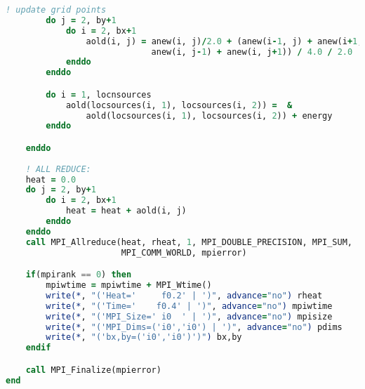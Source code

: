 \begin{lstlisting}[language=Fortran, caption={Parallel F90 implementation of the stencil test case.}]
        ! update grid points
        do j = 2, by+1 
            do i = 2, bx+1
                aold(i, j) = anew(i, j)/2.0 + (anew(i-1, j) + anew(i+1, j) +  &
                             anew(i, j-1) + anew(i, j+1)) / 4.0 / 2.0
            enddo
        enddo

        do i = 1, locnsources
            aold(locsources(i, 1), locsources(i, 2)) =  &
                aold(locsources(i, 1), locsources(i, 2)) + energy
        enddo

    enddo
   
    ! ALL REDUCE:
    heat = 0.0
    do j = 2, by+1 
        do i = 2, bx+1
            heat = heat + aold(i, j)
        enddo
    enddo
    call MPI_Allreduce(heat, rheat, 1, MPI_DOUBLE_PRECISION, MPI_SUM,  &
                       MPI_COMM_WORLD, mpierror)

    if(mpirank == 0) then
        mpiwtime = mpiwtime + MPI_Wtime()
        write(*, "('Heat='     f0.2' | ')", advance="no") rheat
        write(*, "('Time='    f0.4' | ')", advance="no") mpiwtime
        write(*, "('MPI_Size=' i0  ' | ')", advance="no") mpisize
        write(*, "('MPI_Dims=('i0','i0') | ')", advance="no") pdims
        write(*, "('bx,by=('i0','i0')')") bx,by
    endif

    call MPI_Finalize(mpierror)
end
\end{lstlisting}




